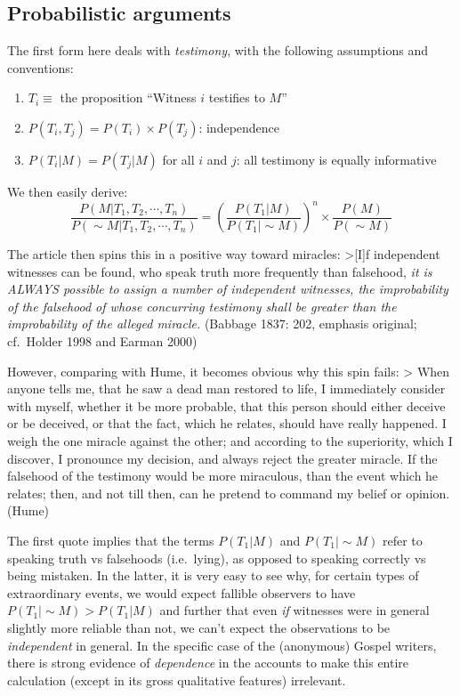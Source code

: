 \subsection{Probabilistic arguments}\label{probabilistic-arguments}

The first form here deals with \emph{testimony}, with the following
assumptions and conventions:

\begin{enumerate}
\def\labelenumi{\arabic{enumi}.}
\itemsep1pt\parskip0pt
\item
  \(T_i\equiv\) the proposition ``Witness \(i\) testifies to \(M\)''
\item
  \(P(T_i,T_j) = P(T_i)\times P(T_j)\): independence
\item
  \(P(T_i|M)=P(T_j|M)\) for all \(i\) and \(j\): all testimony is
  equally informative
\end{enumerate}

We then easily derive: \[
\frac{P(M|T_1,T_2,\cdots,T_n)}{P(\sim\!M|T_1,T_2,\cdots,T_n)} = \left(\frac{P(T_1|M)}{P(T_1|\sim\!M)}\right)^n \times \frac{P(M)}{P(\sim\!M)}
\]

The article then spins this in a positive way toward miracles:
\textgreater{}{[}I{]}f independent witnesses can be found, who speak
truth more frequently than falsehood, \emph{it is ALWAYS possible to
assign a number of independent witnesses, the improbability of the
falsehood of whose concurring testimony shall be greater than the
improbability of the alleged miracle.} (Babbage 1837: 202, emphasis
original; cf.~Holder 1998 and Earman 2000)

However, comparing with Hume, it becomes obvious why this spin fails:
\textgreater{} When anyone tells me, that he saw a dead man restored to
life, I immediately consider with myself, whether it be more probable,
that this person should either deceive or be deceived, or that the fact,
which he relates, should have really happened. I weigh the one miracle
against the other; and according to the superiority, which I discover, I
pronounce my decision, and always reject the greater miracle. If the
falsehood of the testimony would be more miraculous, than the event
which he relates; then, and not till then, can he pretend to command my
belief or opinion. (Hume)

The first quote implies that the terms \(P(T_1|M)\) and
\(P(T_1|\sim\!M)\) refer to speaking truth vs falsehoods (i.e.~lying),
as opposed to speaking correctly vs being mistaken. In the latter, it is
very easy to see why, for certain types of extraordinary events, we
would expect fallible observers to have \(P(T_1|\sim\!M)>P(T_1|M)\) and
further that even \emph{if} witnesses were in general slightly more
reliable than not, we can't expect the observations to be
\emph{independent} in general. In the specific case of the (anonymous)
Gospel writers, there is strong evidence of \emph{dependence} in the
accounts to make this entire calculation (except in its gross
qualitative features) irrelevant.

